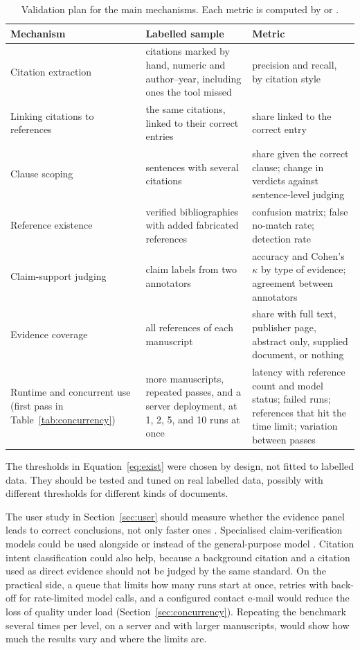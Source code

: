 \documentclass{article}
\newcommand{\vd}[1]{\texttt{\detokenize{#1}}}
\begin{document}
\begin{table}[htbp]
\centering
\caption{Validation plan for the main mechanisms. Each metric is computed by \vd{tools/evaluate.py} or \vd{tools/benchmark.py}.}
\label{tab:protocol}
\small
\begin{tabularx}{\textwidth}{@{}>{\raggedright\arraybackslash}p{3.3cm} >{\raggedright\arraybackslash}X >{\raggedright\arraybackslash}X@{}}
\toprule
\textbf{Mechanism} & \textbf{Labelled sample} & \textbf{Metric}\\
\midrule
Citation extraction & citations marked by hand, numeric and author--year, including ones the tool missed & precision and recall, by citation style\\
\addlinespace
Linking citations to references & the same citations, linked to their correct entries & share linked to the correct entry\\
\addlinespace
Clause scoping & sentences with several citations & share given the correct clause; change in verdicts against sentence-level judging\\
\addlinespace
Reference existence & verified bibliographies with added fabricated references & confusion matrix; false no-match rate; detection rate\\
\addlinespace
Claim-support judging & claim labels from two annotators & accuracy and Cohen's $\kappa$ by type of evidence; agreement between annotators\\
\addlinespace
Evidence coverage & all references of each manuscript & share with full text, publisher page, abstract only, supplied document, or nothing\\
\addlinespace
Runtime and concurrent use (first pass in Table~\ref{tab:concurrency}) & more manuscripts, repeated passes, and a server deployment, at 1, 2, 5, and 10 runs at once & latency with reference count and model status; failed runs; references that hit the time limit; variation between passes\\
\bottomrule
\end{tabularx}
\end{table}

The thresholds in Equation~\eqref{eq:exist} were chosen by design, not fitted to labelled data. They should be tested and tuned on real labelled data, possibly with different thresholds for different kinds of documents.

The user study in Section~\ref{sec:user} should measure whether the evidence panel leads to correct conclusions, not only faster ones \cite{liang2024}. Specialised claim-verification models could be used alongside or instead of the general-purpose model \cite{wadden2020}. Citation intent classification \cite{cohan2019,jurgens2018} could also help, because a background citation and a citation used as direct evidence should not be judged by the same standard. On the practical side, a queue that limits how many runs start at once, retries with back-off for rate-limited model calls, and a configured contact e-mail would reduce the loss of quality under load (Section~\ref{sec:concurrency}). Repeating the benchmark several times per level, on a server and with larger manuscripts, would show how much the results vary and where the limits are.
\end{document}
